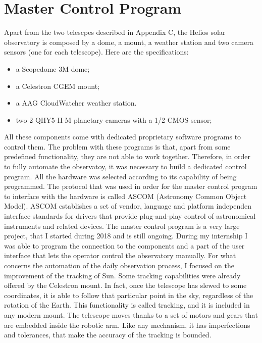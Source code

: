 \chapter{Master Control Program}
\label{appendiceD}
\thispagestyle{empty}
\noindent Apart from the two telescpes described in Appendix C, the Helios solar observatory is composed by a dome, a mount, a weather station and two camera sensors (one for each telescope). Here are the specifications:
\begin{itemize}
  \item a Scopedome 3M dome;
  \item a Celestron CGEM mount;
  \item a AAG CloudWatcher weather station.
  \item two 2 QHY5-II-M planetary cameras with a 1/2 CMOS sensor;
\end{itemize}
All these components come with dedicated proprietary software programs to control them. The problem with these programs is that, apart from some predefined functionality, they are not able to work together. Therefore, in order to fully automate the observatoy, it was necessary to build a dedicated control program.
\bigbreak
\noindent All the hardware was selected according to its capability of being programmed. The protocol that was used in order for the master control program to interface with the hardware is called ASCOM (Astronomy Common Object Model). ASCOM establishes a set of vendor, language and platform independen interface standards for drivers that provide plug-and-play control of astronomical instruments and related devices.
\bigbreak
\noindent The master control program is a very large project, that I started during 2018 and is still ongoing. During my internship I was able to program the connection to the components and a part of the user interface that lets the operator control the observatory manually. For what concerns the automation of the daily observation process, I focused on the improvement of the tracking of Sun.
\bigbreak
\noindent Some tracking capabilities were already offered by the Celestron mount. In fact, once the telescope has slewed to some coordinates, it is able to follow that particular point in the sky, regardless of the rotation of the Earth. This functionality is called tracking, and it is included in any modern mount. The telescope moves thanks to a set of motors and gears that are embedded inside the robotic arm. Like any mechanism, it has imperfections and tolerances, that make the accuracy of the tracking is bounded.
\bigbreak
